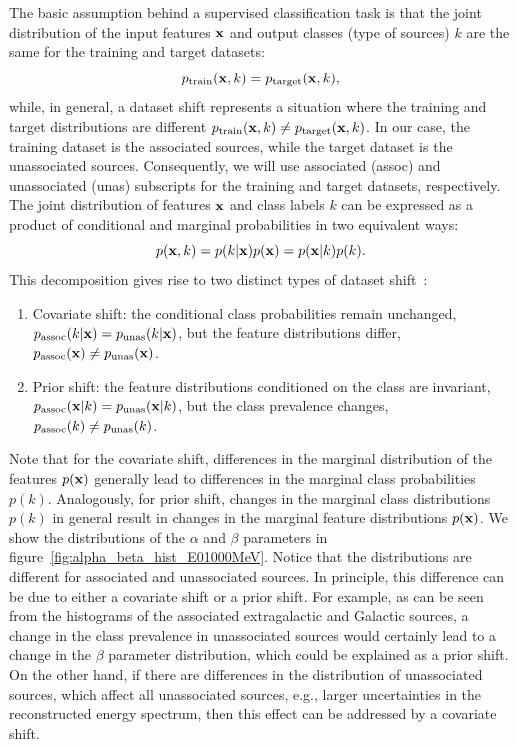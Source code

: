 \documentclass[12pt, a4paper]{article}
\newcommand{\be}{\begin{equation}}
\newcommand{\ee}{\end{equation}}
\newcommand{\ben}{\begin{enumerate}}
\newcommand{\een}{\end{enumerate}}
\newcommand{\bx}{{\bf x}}
\begin{document}
The basic assumption behind a supervised classification task is that the joint distribution of the input features $\bx$
and output classes (type of sources) $k$  are the same for the training and target datasets:
\be
p_{\rm train} (\bx, k) = p_{\rm target} (\bx, k),
\ee
while, in general, a dataset shift represents a situation where the training and target distributions are different
$p_{\rm train} (\bx, k) \neq p_{\rm target} (\bx, k)$.
In our case, the training dataset is the associated sources, while the target dataset is the unassociated sources.
Consequently, we will use associated (assoc) and unassociated (unas) subscripts for the training and target datasets, respectively.
\\
The joint distribution of features $\bx$ and class labels $k$ can be expressed as a product of conditional and marginal probabilities in two equivalent ways:
\be
p(\bx, k) = p(k|\bx) p(\bx) = p(\bx|k) p(k).
\ee
This decomposition gives rise to two distinct types of dataset shift~\citep{MorenoTorres2012AUV}:
\ben
\item
{ Covariate shift}: the conditional class probabilities remain unchanged,\\
{$p_{\rm assoc}(k|\bx) = p_{\rm unas}(k|\bx)$}, but the feature distributions differ, $p_{\rm assoc}(\bx) \neq p_{\rm unas}(\bx)$.
\item
{ Prior shift}: the feature distributions conditioned on the class are invariant, $p_{\rm assoc}(\bx|k) = p_{\rm unas}(\bx|k)$, but the class prevalence changes, $p_{\rm assoc}(k) \neq p_{\rm unas}(k)$.
\een
Note that for the covariate shift, differences in the marginal distribution of the features $p(\bx)$ generally lead to differences in the marginal class probabilities $p(k)$.
Analogously, for prior shift, changes in the marginal class distributions $p(k)$ in general result in changes in the marginal feature distributions $p(\bx)$. We show the distributions of the $\alpha$ and $\beta$ parameters in figure~\ref{fig:alpha_beta_hist_E01000MeV}. Notice that the distributions are different for associated and unassociated sources.
In principle, this difference can be due to either a covariate shift or a prior shift. 
For example, as can be seen from the histograms of the associated extragalactic and Galactic sources, a change in the class prevalence in unassociated sources would certainly lead to a change in the $\beta$ parameter distribution, which could be explained as a prior shift.
On the other hand, if there are differences in the distribution of unassociated sources, which affect all unassociated sources, e.g., larger uncertainties in the reconstructed energy spectrum, 
then this effect can be addressed by a covariate shift.
\end{document}
